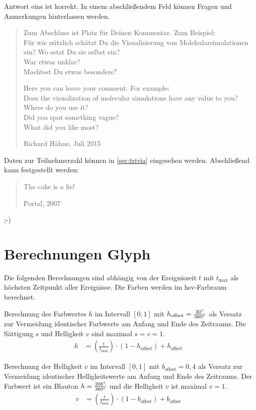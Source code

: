 Antwort eins ist korrekt. In einem abschließendem Feld können Fragen und Anmerkungen hinterlassen werden.

\blockquote[Richard Hähne, Juli 2015]{
	Zum Abschluss ist Platz für Deinen Kommentar. Zum Beispiel:\\
	Für wie nützlich schätzt Du die Visualisierung von Molekularsimulationen ein? Wo setzt Du sie selbst ein? \\
	War etwas unklar?\\
	Mochtest Du etwas besonders?
	
	Here you can leave your comment. For example:\\
	Does the visualization of molecular simulations have any value to you? Where do you use it?\\
	Did you spot something vague?\\
	What did you like most?
}

Daten zur Teilnehmerzahl können in \autoref{sec:trivia} eingesehen werden. Abschließend kann festgestellt werden:
\blockquote[Portal, 2007]{
	The cake is a lie!
}
;-)

\section{Berechnungen Glyph}\label{sec:berechnungen:glyph}
Die folgenden Berechnungen sind abhängig von der Ereigniszeit $t$ mit $t_{\text{max}}$ als höchsten Zeitpunkt aller Ereignisse. Die Farben werden im \gls{hsv}-Farbraum berechnet.

Berechnung des Farbwertes $h$ im Intervall $[0,1]$ mit $h_{\text{offset}} = \frac{30\degree}{360\degree}$ als Versatz zur Vermeidung identischer Farbwerte am Anfang und Ende des Zeitraums. Die Sättigung $s$ und Helligkeit $v$ sind maximal $s = v = 1$.
\begin{equation}
\begin{aligned}\label{eq:berechnungen:glyph-farbe}
h &= \left(\frac{t}{t_{\text{max}}}\right) \cdot (1 - h_{\text{offset}}) + h_{\text{offset}}
\end{aligned}
\end{equation}

Berechnung der Helligkeit $v$ im Intervall $[0,1]$ mit $b_{\text{offset}} = 0,4$ als Versatz zur Vermeidung identischer Helligkeitswerte am Anfang und Ende des Zeitraums. Der Farbwert ist ein Blauton $h = \frac{208\degree}{360\degree}$ und die Helligkeit $v$ ist maximal $v = 1$.
\begin{equation}
\begin{aligned}\label{eq:berechnungen:glyph-helligkeit}
v &= \left(\frac{t}{t_{\text{max}}}\right) \cdot (1 - b_{\text{offset}}) + b_{\text{offset}}
\end{aligned}
\end{equation}

